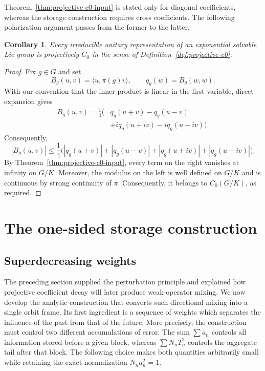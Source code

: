 \documentclass[10pt,a4paper]{amsart}
\numberwithin{equation}{section}
\newtheorem{corollary}[theorem]{Corollary}
\begin{document}
Theorem~\ref{thm:projective-c0-input} is stated only for diagonal
coefficients, whereas the storage construction requires cross coefficients.
The following polarization argument passes from the former to the latter.

\begin{corollary}\label{cor:cross-c0}
Every irreducible unitary representation of an exponential solvable Lie group is
projectively $C_0$ in the sense of Definition~\ref{def:projective-c0}.
\end{corollary}

\begin{proof}
Fix $g\in G$ and set
\[
 B_g(u,v)=\langle u,\pi(g)v\rangle,
 \qquad q_g(w)=B_g(w,w).
\]
With our convention that the inner product is linear in the first variable,
direct expansion gives
\begin{equation}\label{eq:polarization}
\begin{aligned}
 B_g(u,v)=\frac14\bigl(&q_g(u+v)-q_g(u-v)\\
 &+i q_g(u+iv)-i q_g(u-iv)\bigr).
\end{aligned}
\end{equation}
Consequently,
\[
 |B_g(u,v)|
 \leq\frac14\bigl(
 |q_g(u+v)|+|q_g(u-v)|+|q_g(u+iv)|+|q_g(u-iv)|
 \bigr).
\]
By Theorem~\ref{thm:projective-c0-input}, every term on the right vanishes at
infinity on $G/K$.  Moreover, the modulus on the left is
well defined on $G/K$ and is continuous by strong continuity of $\pi$.
Consequently, it belongs to $C_0(G/K)$, as required.
\end{proof}

\section{The one-sided storage construction}\label{sec:storage}

\subsection{Superdecreasing weights}

The preceding section supplied the perturbation principle and explained how
projective coefficient decay will later produce weak-operator mixing.  We now
develop the analytic construction that converts such directional mixing into
a single orbit frame.  Its first ingredient is a sequence of weights
which separates the influence of the past from that of the future.  More
precisely, the construction must control two different accumulations of error.  The
sum $\sum a_n$ controls all information stored before a given block, whereas
$\sum N_nT_n^2$ controls the aggregate tail after that block.  The following
choice makes both quantities arbitrarily small while retaining the exact
normalization $N_na_n^2=1$.
\end{document}
